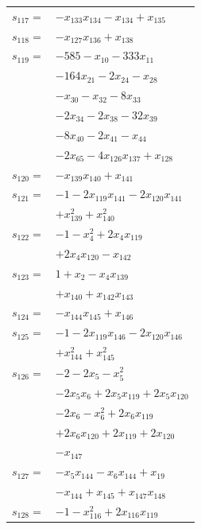\begin{longtable}{@{}r@{\;}l@{}}
\(s_{117}=\) & \(\displaystyle -x_{133}x_{134} -x_{134} +x_{135}\) \\[3pt]
\(s_{118}=\) & \(\displaystyle -x_{127}x_{136} +x_{138}\) \\[3pt]
\(s_{119}=\) & \(\displaystyle -585 -x_{10} -333x_{11}\) \\
 & \(\displaystyle -164x_{21} -2x_{24} -x_{28}\) \\
 & \(\displaystyle -x_{30} -x_{32} -8x_{33}\) \\
 & \(\displaystyle -2x_{34} -2x_{38} -32x_{39}\) \\
 & \(\displaystyle -8x_{40} -2x_{41} -x_{44}\) \\
 & \(\displaystyle -2x_{65} -4x_{126}x_{137} +x_{128}\) \\[3pt]
\(s_{120}=\) & \(\displaystyle -x_{139}x_{140} +x_{141}\) \\[3pt]
\(s_{121}=\) & \(\displaystyle -1 -2x_{119}x_{141} -2x_{120}x_{141}\) \\
 & \(\displaystyle +x_{139}^{2} +x_{140}^{2}\) \\[3pt]
\(s_{122}=\) & \(\displaystyle -1 -x_{4}^{2} +2x_{4}x_{119}\) \\
 & \(\displaystyle +2x_{4}x_{120} -x_{142}\) \\[3pt]
\(s_{123}=\) & \(\displaystyle 1 +x_{2} -x_{4}x_{139}\) \\
 & \(\displaystyle +x_{140} +x_{142}x_{143}\) \\[3pt]
\(s_{124}=\) & \(\displaystyle -x_{144}x_{145} +x_{146}\) \\[3pt]
\(s_{125}=\) & \(\displaystyle -1 -2x_{119}x_{146} -2x_{120}x_{146}\) \\
 & \(\displaystyle +x_{144}^{2} +x_{145}^{2}\) \\[3pt]
\(s_{126}=\) & \(\displaystyle -2 -2x_{5} -x_{5}^{2}\) \\
 & \(\displaystyle -2x_{5}x_{6} +2x_{5}x_{119} +2x_{5}x_{120}\) \\
 & \(\displaystyle -2x_{6} -x_{6}^{2} +2x_{6}x_{119}\) \\
 & \(\displaystyle +2x_{6}x_{120} +2x_{119} +2x_{120}\) \\
 & \(\displaystyle -x_{147}\) \\[3pt]
\(s_{127}=\) & \(\displaystyle -x_{5}x_{144} -x_{6}x_{144} +x_{19}\) \\
 & \(\displaystyle -x_{144} +x_{145} +x_{147}x_{148}\) \\[3pt]
\(s_{128}=\) & \(\displaystyle -1 -x_{116}^{2} +2x_{116}x_{119}\) \\

\end{longtable}
